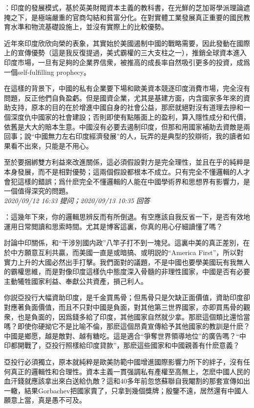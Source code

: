 \documentclass[twocolumn]{ctexart}
\begin{document}
：印度的發展模式，基於英美財閥資本主義的教科書，在光鮮的芝加哥學派理論遮掩之下，是極端嚴重的官商勾結和貧富分化。在對實體工業發展真正重要的國民教育水準和物流基礎設施上，並沒有實際上的比較優勢。

近年來印度欣欣向榮的表象，其實始於美國遏制中國的戰略需要，因此發動在國際上的宣傳優勢（這是我反復提過，美式霸權的三大支柱之一），推銷全球資本進入印度市場，一旦有足夠的企業界信衆，被推高的成長率自然吸引更多的投資，成爲一個self-fulfilling prophecy。

在這樣的背景下，中國的私有企業要下場和歐美資本競逐印度消費市場，完全沒有問題，反正他們自負盈虧。但是國資企業，尤其是基建方面，内含國家多年來的資助支持，原本的目的在於增進中國自身的社會公益，那麽就絕對沒有道理去摻和一個深度仇中國家的社會建設；否則即使有點賬面上的盈利，算入隱性成分和代價，依舊是大大的賠本生意。中國沒有必要去遏制印度，但那和用國家補助去資敵是兩回事；說“中國無力左右印度經濟發展”的人，玩弄的是典型的狡辯術，我的讀者如果看不出來，只能是不用心。

至於要捆綁雙方利益來改進關係，這必須假設對方是完全理性，並且在乎的純粹是本身發展，而不是相對優勢；這兩個假設都根本不成立。只有完全不懂邏輯的人才會犯這樣的錯誤；爲什麽完全不懂邏輯的人能在中國學術界和思想界有影響力，是一個值得深究的問題。
\\

\textit{\hfill\noindent\small 2020/09/12 16:33 提问；2020/09/13 10:35 回答}

：這幾年下來，你的邏輯思辨反而有所倒退。有空應該自我反省一下，是否有效地運用日常閲讀和思索時間。尤其是博客這裏，你真的用心仔細讀懂了嗎？

討論中印關係，和“干涉別國内政”八竿子打不到一塊兒。這裏中美的真正差別，在於中方願意互利共贏，而美國一直是或暗搞、或明説的“America First”，所以對實力上升的大國必然出手打擊。我們面對的議題，不是中國也要學美國玩有我無人的霸權思維，而是對像印度這樣仇中態度深入骨髓的非理性國家，中國是否有必要主動犧牲國家利益、奉獻公共資產，損己利人。

你説亞投行大幅資助印度，是千金買馬骨；但馬骨只是欠缺正面價值，資助印度卻對應著負面價值，而且不只對中國是負面，對其他第三世界國家，亦即買馬骨的觀衆，也是負面的，因爲錢多給了印度，其他國家自然就少拿。那麽這個類比還恰當嗎？即使你硬拗它不是比喻不倫，那麽這個昂貴宣傳給予其他國家的教訓是什麽？中國是鄉愿，越是敵對、越有糖吃。這是適合“爭奪世界領導地位”的廣告嗎？“中印都開戰了，亞投行照樣給印度貸款”，那麽這些國家和中國親善有什麽意義？

亞投行必須獨立，原本就純粹是歐美防範中國增進國際影響力所下的絆子，沒有任何真正的邏輯性和合理性。資本主義一貫强調私有產權至高無上，怎麽中國人民的血汗錢就應該拿出來白送給仇敵？這和40多年前忽悠蘇聯自我閹割的那套宣傳如出一轍，結果Gorbachev把國家賣了，只拿到幾個獎牌；殷鑒不遠，居然還有中國人願意上當，真是愚不可及。
\\
\end{document}

